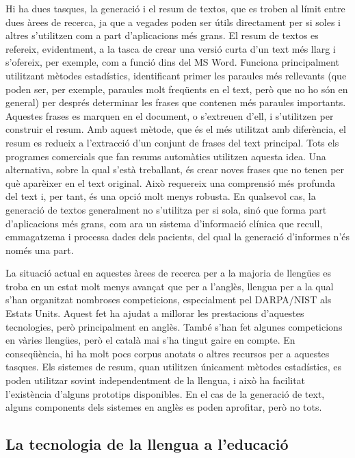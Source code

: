 \begin{multicols}{2}
Hi ha dues tasques, la generació i el resum de textos, que es troben al límit entre dues àrees de recerca, ja que a vegades poden ser útils directament per si soles i altres s’utilitzen com a part d’aplicacions més grans. El resum de textos es refereix, evidentment, a la tasca de crear una versió curta d’un text més llarg i s’ofereix, per exemple, com a funció dins del MS Word. Funciona principalment utilitzant mètodes estadístics, identificant primer les paraules més rellevants (que poden ser, per exemple, paraules molt freqüents en el text, però que no ho són en general) per després determinar les frases que contenen més paraules importants. Aquestes frases es marquen en el document, o s’extreuen d’ell, i s’utilitzen per construir el resum. Amb aquest mètode, que és el més utilitzat amb diferència, el resum es redueix a l’extracció d’un conjunt de frases del text principal. Tots els programes comercials que fan resums automàtics utilitzen aquesta idea. Una alternativa, sobre la qual s’està treballant, és crear noves frases que no tenen per què aparèixer en el text original. Això requereix una comprensió més profunda del text i, per tant, és una opció molt menys robusta. En qualsevol cas, la generació de textos generalment no s’utilitza per si sola, sinó que forma part d’aplicacions més grans, com ara un sistema d’informació clínica que recull, emmagatzema i processa dades dels pacients, del qual la generació d’informes n’és només una part. 

La situació actual en aquestes àrees de recerca per a la majoria de llengües es troba en un estat molt menys avançat que per a l’anglès, llengua per a la qual s’han organitzat nombroses competicions, especialment pel DARPA/NIST als Estats Units. Aquest fet ha ajudat a millorar les prestacions d’aquestes tecnologies, però principalment en anglès. També s’han fet algunes competicions en vàries llengües, però el català mai s’ha tingut gaire en compte. En conseqüència, hi ha molt pocs corpus anotats o altres recursos per a aquestes tasques. Els sistemes de resum, quan utilitzen únicament mètodes estadístics, es poden utilitzar sovint independentment de la llengua, i això ha facilitat l’existència d’alguns prototips disponibles. En el cas de la generació de text, alguns components dels sistemes en anglès es poden aprofitar, però no tots. 

\subsection{La tecnologia de la llengua a l’educació}


\end{multicols}
